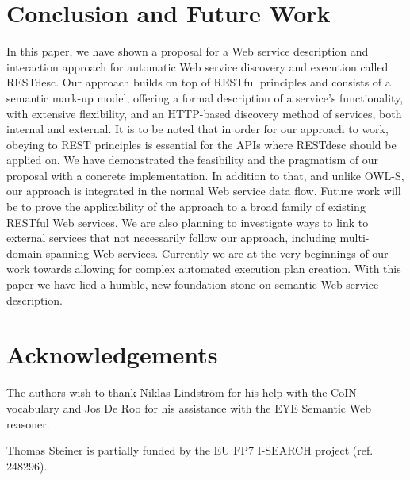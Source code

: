 \documentclass[runningheads,a4paper, twocolumn]{llncs}
\begin{document}
\section{Conclusion and Future Work} \label{sec:conclusion-and-future-work}
In this paper, we have shown a proposal for a Web service description and interaction approach for automatic Web service discovery and execution called RESTdesc. Our approach builds on top of RESTful principles and consists of a semantic mark-up model, offering a formal description of a service's functionality, with extensive flexibility, and an HTTP-based discovery method of services, both internal and external. It is to be noted that in order for our approach to work, obeying to REST principles is essential for the APIs where RESTdesc should be applied on. We have demonstrated the feasibility and the pragmatism of our proposal with a concrete implementation. In addition to that, and unlike OWL-S, our approach is integrated in the normal Web service data flow. Future work will be to prove the applicability of the approach to a broad family of existing RESTful Web services. We are also planning to investigate ways to link to external services that not necessarily follow our approach, including multi-domain-spanning Web services. Currently we are at the very beginnings of our work towards allowing for complex automated execution plan creation. With this paper we have lied a humble, new foundation stone on semantic Web service description.

\section*{Acknowledgements} \label{sec:acknowledgements}
The authors wish to thank Niklas Lindstr\"om for his help with the CoIN vocabulary and Jos De Roo for his assistance with the EYE Semantic Web reasoner.

{Thomas Steiner is partially funded by the EU FP7 I-SEARCH project (ref. 248296).}{}

\renewcommand{\ttdefault}{cmvtt}
\renewcommand\UrlFont\tt



\end{document}
